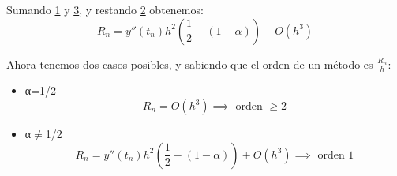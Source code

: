 \begin{problem}[5]
Sumando \hyperref[ej1-5_tresTerminos]{1} y \hyperref[ej1-5_tresTerminos]{3}, y restando \hyperref[ej1-5_tresTerminos]{2} obtenemos:
\[R_n = y''(t_n)h^2 \left(\frac{1}{2}-(1-α) \right)+O(h^3)\]


Ahora tenemos dos casos posibles, y sabiendo que el orden de un método es $\frac{R_n}{h}$:
\begin{itemize}
\item α=1/2
\[R_n=O(h^3) \implies \text{ orden } \geq 2\]
\item α$\neq$1/2
\[R_n = y''(t_n)h^2 \left(\frac{1}{2}-(1-α) \right) + O(h^3) \implies \text{ orden } 1\]
\end{itemize}

\end{problem}